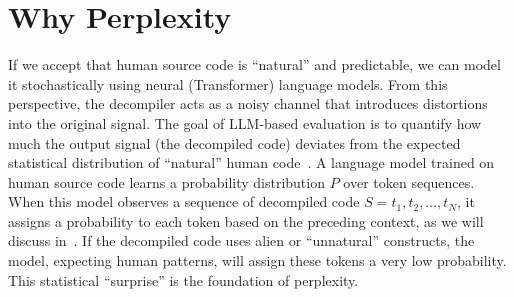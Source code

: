 \section{Why Perplexity}\label{sec:WhyPerp}
If we accept that human source code is ``natural'' and predictable, we can model it stochastically 
using neural (Transformer) language models. From this perspective, the decompiler acts as a noisy 
channel that introduces distortions into the original signal. The goal of \ac{LLM}-based evaluation is to 
quantify how much the output signal (the decompiled code) deviates from the expected statistical 
distribution of ``natural'' human code~\cite{Paper:hindle2012naturalness}. 
A language model trained on human source code learns a probability distribution $P$ over token sequences. 
When this model observes a sequence of decompiled code $S = t_1, t_2, \ldots, t_N$, it assigns a probability to each token based on the preceding context, as we will discuss in~. 
If the decompiled code uses alien or ``unnatural'' constructs, the model, expecting human patterns, will assign these tokens a very low probability. 
This statistical ``surprise'' is the foundation of perplexity.